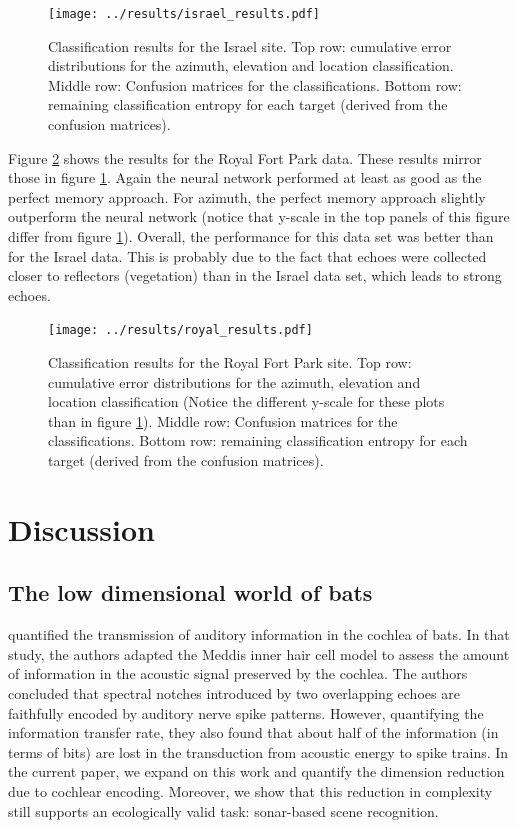 \documentclass[preprint,5p]{elsarticle}
\begin{document}
\begin{figure}
	\centering
	\texttt{[image: ../results/israel\_results.pdf]}
	\caption{Classification results for the Israel site. Top row: cumulative error distributions for the azimuth, elevation and location classification. Middle row: Confusion matrices for the classifications. Bottom row: remaining classification entropy for each target (derived from the confusion matrices).}
	\label{fig:israelperformance}
\end{figure}


Figure \ref{fig:royalperformance} shows the results for the Royal Fort Park data. These results mirror those in figure \ref{fig:israelperformance}. Again the neural network performed at least as good as the perfect memory approach. For azimuth, the perfect memory approach slightly outperform the neural network (notice that y-scale in the top panels of this figure differ from figure \ref{fig:israelperformance}). Overall, the performance for this data set was better than for the Israel data. This is probably due to the fact that echoes were collected closer to reflectors (vegetation) than in the Israel data set, which leads to strong echoes.

\begin{figure}
	\centering
	\texttt{[image: ../results/royal\_results.pdf]}
	\caption{Classification results for the Royal Fort Park site. Top row: cumulative error distributions for the azimuth, elevation and location classification (Notice the different y-scale for these plots than in figure \ref{fig:israelperformance}). Middle row: Confusion matrices for the classifications. Bottom row: remaining classification entropy for each target (derived from the confusion matrices).}
	\label{fig:royalperformance}
\end{figure}


\section{Discussion}

\subsection{The low dimensional world of bats}

\citet{Reijniers2010a} quantified the transmission of auditory information in the cochlea of bats. In that study, the authors adapted the Meddis inner hair cell model \citep{Meddis2006} to assess the amount of information in the acoustic signal preserved by the cochlea. The authors concluded that spectral notches introduced by two overlapping echoes are faithfully encoded by auditory nerve spike patterns. However, quantifying the information transfer rate, they also found that about half of the information (in terms of bits) are lost in the transduction from acoustic energy to spike trains. In the current paper, we expand on this work and quantify the dimension reduction due to cochlear encoding. Moreover, we show that this reduction in complexity still supports an ecologically valid task: sonar-based scene recognition.
\end{document}

